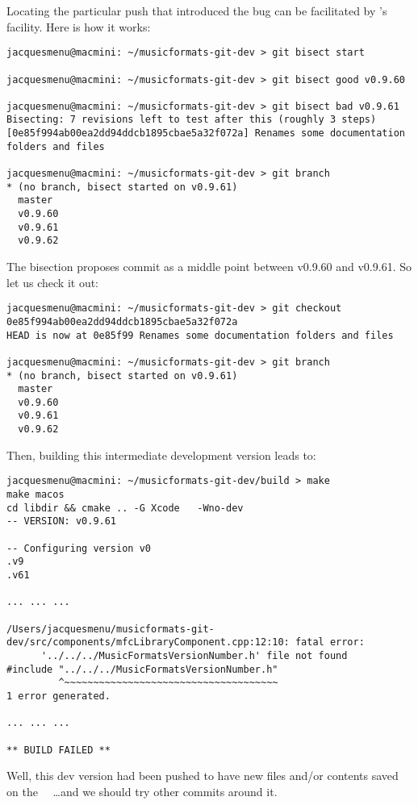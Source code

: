 Locating the particular push that introduced the bug can be facilitated by \git 's  facility.
Here is how it works:
\begin{lstlisting}[language=Terminal]
jacquesmenu@macmini: ~/musicformats-git-dev > git bisect start

jacquesmenu@macmini: ~/musicformats-git-dev > git bisect good v0.9.60

jacquesmenu@macmini: ~/musicformats-git-dev > git bisect bad v0.9.61
Bisecting: 7 revisions left to test after this (roughly 3 steps)
[0e85f994ab00ea2dd94ddcb1895cbae5a32f072a] Renames some documentation folders and files

jacquesmenu@macmini: ~/musicformats-git-dev > git branch
* (no branch, bisect started on v0.9.61)
  master
  v0.9.60
  v0.9.61
  v0.9.62
\end{lstlisting}

The bisection proposes commit  as a middle point between v0.9.60 and v0.9.61.
So let us check it out:
\begin{lstlisting}[language=Terminal]
jacquesmenu@macmini: ~/musicformats-git-dev > git checkout 0e85f994ab00ea2dd94ddcb1895cbae5a32f072a
HEAD is now at 0e85f99 Renames some documentation folders and files

jacquesmenu@macmini: ~/musicformats-git-dev > git branch
* (no branch, bisect started on v0.9.61)
  master
  v0.9.60
  v0.9.61
  v0.9.62
\end{lstlisting}

Then, building this intermediate development version leads to:
\begin{lstlisting}[language=Terminal]
jacquesmenu@macmini: ~/musicformats-git-dev/build > make
make macos
cd libdir && cmake .. -G Xcode   -Wno-dev
-- VERSION: v0.9.61

-- Configuring version v0
.v9
.v61

... ... ...

/Users/jacquesmenu/musicformats-git-dev/src/components/mfcLibraryComponent.cpp:12:10: fatal error:
      '../../../MusicFormatsVersionNumber.h' file not found
#include "../../../MusicFormatsVersionNumber.h"
         ^~~~~~~~~~~~~~~~~~~~~~~~~~~~~~~~~~~~~~
1 error generated.

... ... ...

** BUILD FAILED **
\end{lstlisting}

Well, this dev version had been pushed to have new files and/or contents saved on the \mf\ \repo\ \dots and we should try other commits around it.

